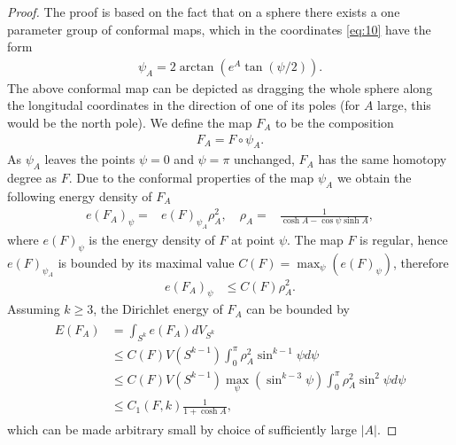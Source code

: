 \begin{proof}
  The proof is based on the fact that on a sphere there exists a one
  parameter group of conformal maps, which in the coordinates
  \eqref{eq:10} have the form
  \begin{align}
    \label{eq:13}
    \psi_A=2\arctan(e^A\tan(\psi/2)).
  \end{align}
  The above conformal map can be depicted as dragging the whole sphere
  along the longitudal coordinates in the direction of one of its
  poles (for $A$ large, this would be the north pole). We define the
  map $F_A$ to be the composition
  \begin{align}
    \label{eq:14}
    F_A=F\circ\psi_A.
  \end{align}
  As $\psi_A$ leaves the points $\psi=0$ and $\psi=\pi$ unchanged,
  $F_A$ has the same homotopy degree as $F$. Due to the conformal
  properties of the map $\psi_A$ we obtain the following energy
  density of $F_A$
  \begin{align}
    \label{eq:15}
    e(F_A)_\psi=&e(F)_{\psi_A}\rho_A^2,\quad
    \rho_A=&\frac{1}{\cosh A-\cos\psi\sinh A},
  \end{align}
  where $e(F)_\psi$ is the energy density of $F$ at point $\psi$.  The
  map $F$ is regular, hence $e(F)_{\psi_A}$ is bounded by its maximal
  value $C(F)=\max_\psi\left(e(F)_\psi\right)$, therefore
  \begin{align}
    \label{eq:16}
    e(F_A)_\psi&\le C(F)\rho_A^2.
  \end{align}
  Assuming $k\ge3$, the Dirichlet energy of $F_A$ can be bounded by
  \begin{align}
    \label{eq:17}
    \begin{split}
      E(F_A)&=\int_{S^k}e(F_A)dV_{S^k}\\
      &\le C(F)V(S^{k-1})\int_{0}^{\pi}\rho_A^2\sin^{k-1}\psi d\psi\\
      &\le C(F)V(S^{k-1})\max_\psi(\sin^{k-3}\psi)\int_{0}^{\pi}\rho_A^2\sin^2\psi d\psi\\
      &\le C_1(F,k)\frac{1}{1+\cosh A},
    \end{split}
  \end{align}
  which can be made arbitrary small by choice of sufficiently large
  $\lvert A\rvert$.%

\end{proof}



